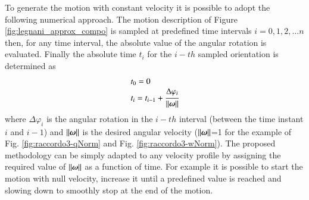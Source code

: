 To generate the motion with constant velocity it is possible to adopt the following numerical approach. The motion description of Figure \ref{fig:legnani_approx_compo} is sampled at predefined time intervals $i=0, 1, 2,\ldots n$ then, for any time interval, the absolute value of the angular rotation is evaluated. Finally the absolute time $t_i$ for the $i-th$ sampled orientation is determined as
\begin{equation}
    \begin{array}{l}
        t_0=0\\
        t_i=t_{i-1}+\cfrac{\Delta\varphi_i}{\left\lVert{\boldsymbol{\omega}}\right\rVert}
    \end{array}
    \label{eq:deltaT}
\end{equation}
where $\Delta\varphi_i$ is the angular rotation in the $i-th$ interval (between the time instant $i$ and $i-1$) and $\left\lVert{\boldsymbol{\omega}}\right\rVert$ is the desired angular velocity ($\left\lVert{\boldsymbol{\omega}}\right\rVert$=1 for the example of Fig. \ref{fig:raccordo3-qNorm} and Fig. \ref{fig:raccordo3-wNorm}). The proposed methodology can be simply adapted to any velocity profile by assigning the required value of $\left\lVert{\boldsymbol{\omega}}\right\rVert$ as a function of time. For example it is possible to start the motion with null velocity, increase it until a predefined value is reached and slowing down to smoothly stop at the end of the motion.

